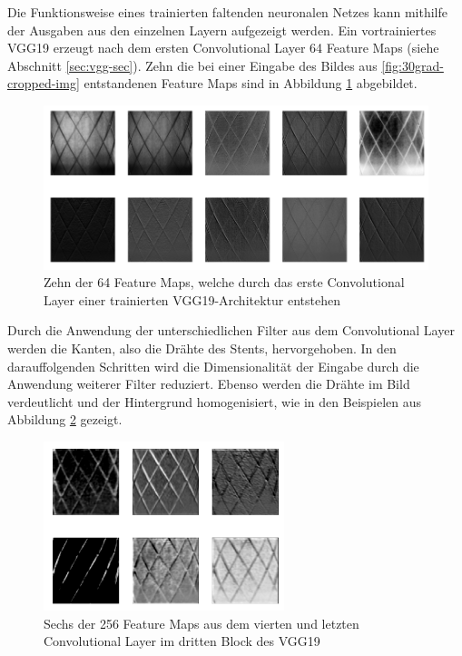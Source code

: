 \mypar Die Funktionsweise eines trainierten faltenden neuronalen Netzes kann mithilfe der Ausgaben aus den einzelnen Layern aufgezeigt werden. Ein vortrainiertes VGG19 erzeugt nach dem ersten Convolutional Layer 64 Feature Maps (siehe Abschnitt \ref{sec:vgg-sec}). Zehn die bei einer Eingabe des Bildes aus \ref{fig:30grad-cropped-img} entstandenen Feature Maps sind in Abbildung \ref{fig:activations-1} abgebildet.

\begin{figure}[h!]
\centering
\includegraphics[width=12cm]{98_images/0_block1_conv1.png}
\caption{Zehn der 64 Feature Maps, welche durch das erste Convolutional Layer einer trainierten VGG19-Architektur entstehen}
\label{fig:activations-1}
\end{figure}

\mypar Durch die Anwendung der unterschiedlichen Filter aus dem Convolutional Layer werden die Kanten, also die Drähte des Stents, hervorgehoben. In den darauffolgenden Schritten wird die Dimensionalität der Eingabe durch die Anwendung weiterer Filter reduziert. Ebenso werden die Drähte im Bild verdeutlicht und der Hintergrund homogenisiert, wie in den Beispielen aus Abbildung \ref{fig:activations-2} gezeigt.

\begin{figure}[h!]
\centering
\includegraphics[width=7cm]{98_images/0_block3_conv4.png}
\caption{Sechs der 256 Feature Maps aus dem vierten und letzten Convolutional Layer im dritten Block des VGG19}
\label{fig:activations-2}
\end{figure}


